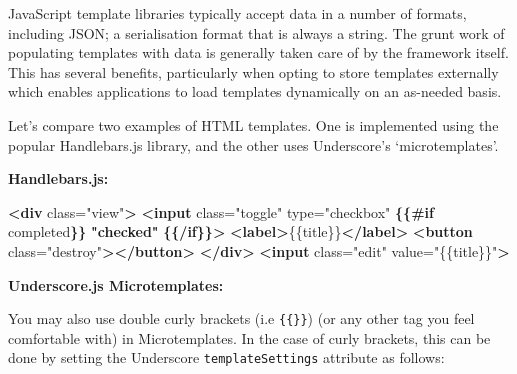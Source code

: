 \documentclass[9pt]{book}
\newenvironment{Shaded}{}{}
\newcommand{\KeywordTok}[1]{\textcolor[rgb]{0.00,0.44,0.13}{\textbf{{#1}}}}
\newcommand{\StringTok}[1]{\textcolor[rgb]{0.25,0.44,0.63}{{#1}}}
\newcommand{\OtherTok}[1]{\textcolor[rgb]{0.00,0.44,0.13}{{#1}}}
\newcommand{\ErrorTok}[1]{\textcolor[rgb]{1.00,0.00,0.00}{\textbf{{#1}}}}
\newcommand{\NormalTok}[1]{{#1}}
\begin{document}
JavaScript template libraries typically accept data in a number of
formats, including JSON; a serialisation format that is always a string.
The grunt work of populating templates with data is generally taken care
of by the framework itself. This has several benefits, particularly when
opting to store templates externally which enables applications to load
templates dynamically on an as-needed basis.

Let's compare two examples of HTML templates. One is implemented using
the popular Handlebars.js library, and the other uses Underscore's
`microtemplates'.

\textbf{Handlebars.js:}

\begin{Shaded}
\begin{Highlighting}[]
\KeywordTok{<div}\OtherTok{ class=}\StringTok{"view"}\KeywordTok{>}
  \KeywordTok{<input}\OtherTok{ class=}\StringTok{"toggle"}\OtherTok{ type=}\StringTok{"checkbox"} \ErrorTok{\{\{#if}\OtherTok{ completed}\ErrorTok{\}\}} \ErrorTok{"checked"} \ErrorTok{\{\{/if\}\}}\KeywordTok{>}
  \KeywordTok{<label>}\NormalTok{\{\{title\}\}}\KeywordTok{</label>}
  \KeywordTok{<button}\OtherTok{ class=}\StringTok{"destroy"}\KeywordTok{></button>}
\KeywordTok{</div>}
\KeywordTok{<input}\OtherTok{ class=}\StringTok{"edit"}\OtherTok{ value=}\StringTok{"\{\{title\}\}"}\KeywordTok{>}
\end{Highlighting}
\end{Shaded}

\textbf{Underscore.js Microtemplates:}

\begin{Shaded}
\end{Shaded}

You may also use double curly brackets (i.e \texttt{\{\{\}\}}) (or any
other tag you feel comfortable with) in Microtemplates. In the case of
curly brackets, this can be done by setting the Underscore
\texttt{templateSettings} attribute as follows:
\end{document}
